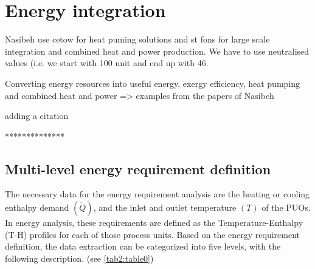 \section{Energy integration}


Nasibeh use cetow for heat puming solutions and st fons for large scale integration and combined heat and power production. We have to use neutralised values (i.e. we start with 100 unit and end up with 46.


Converting energy resources into useful energy, exergy efficiency, heat pumping and combined heat and power => examples from the papers of Nasibeh

adding a citation \cite{Pouransari_2014}



**************
\subsection{Multi-level energy requirement definition}
\label{subsec:Multi-layer}
The necessary data for the energy requirement analysis are the heating or cooling enthalpy demand $(\dot{Q})$, and the inlet and outlet temperature $ (T) $ of the PUOs. In energy analysis, these requirements are defined as the Temperature-Enthalpy (T-H) profiles for each of those process units. Based on the energy requirement definition, the data extraction can be categorized into five levels, with the following description. (see \cref{tab2:table0})

